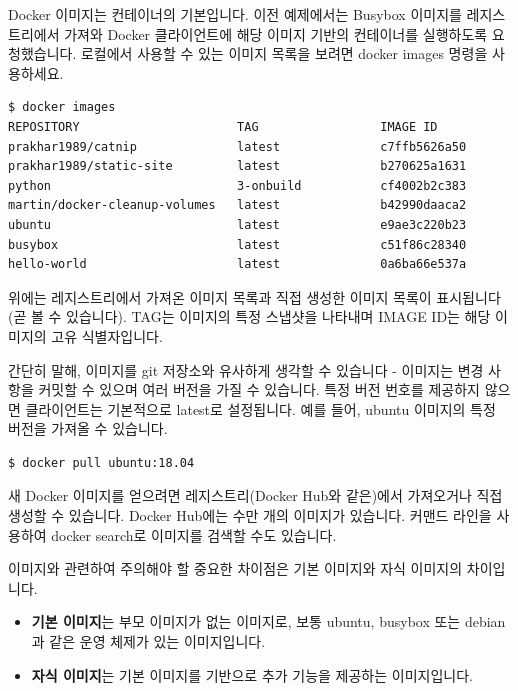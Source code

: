 Docker 이미지는 컨테이너의 기본입니다. 이전 예제에서는 Busybox 이미지를 레지스트리에서 가져와 Docker 클라이언트에 해당 이미지 기반의 컨테이너를 실행하도록 요청했습니다. 로컬에서 사용할 수 있는 이미지 목록을 보려면 docker images 명령을 사용하세요.
\begin{lstlisting}[language=bash]
$ docker images
REPOSITORY                      TAG                 IMAGE ID            CREATED             VIRTUAL SIZE
prakhar1989/catnip              latest              c7ffb5626a50        2 hours ago         697.9 MB
prakhar1989/static-site         latest              b270625a1631        21 hours ago        133.9 MB
python                          3-onbuild           cf4002b2c383        5 days ago          688.8 MB
martin/docker-cleanup-volumes   latest              b42990daaca2        7 weeks ago         22.14 MB
ubuntu                          latest              e9ae3c220b23        7 weeks ago         187.9 MB
busybox                         latest              c51f86c28340        9 weeks ago         1.109 MB
hello-world                     latest              0a6ba66e537a        11 weeks ago        960 B
\end{lstlisting}

위에는 레지스트리에서 가져온 이미지 목록과 직접 생성한 이미지 목록이 표시됩니다(곧 볼 수 있습니다). TAG는 이미지의 특정 스냅샷을 나타내며 IMAGE ID는 해당 이미지의 고유 식별자입니다.

간단히 말해, 이미지를 git 저장소와 유사하게 생각할 수 있습니다 - 이미지는 변경 사항을 커밋할 수 있으며 여러 버전을 가질 수 있습니다. 특정 버전 번호를 제공하지 않으면 클라이언트는 기본적으로 latest로 설정됩니다. 예를 들어, ubuntu 이미지의 특정 버전을 가져올 수 있습니다.
\begin{lstlisting}[language=bash]
$ docker pull ubuntu:18.04
\end{lstlisting}

새 Docker 이미지를 얻으려면 레지스트리(Docker Hub와 같은)에서 가져오거나 직접 생성할 수 있습니다. Docker Hub에는 수만 개의 이미지가 있습니다. 커맨드 라인을 사용하여 docker search로 이미지를 검색할 수도 있습니다.

이미지와 관련하여 주의해야 할 중요한 차이점은 기본 이미지와 자식 이미지의 차이입니다.
\begin{itemize}
    \item \textbf{기본 이미지}는 부모 이미지가 없는 이미지로, 보통 ubuntu, busybox 또는 debian과 같은 운영 체제가 있는 이미지입니다.
    \item \textbf{자식 이미지}는 기본 이미지를 기반으로 추가 기능을 제공하는 이미지입니다.
\end{itemize}

